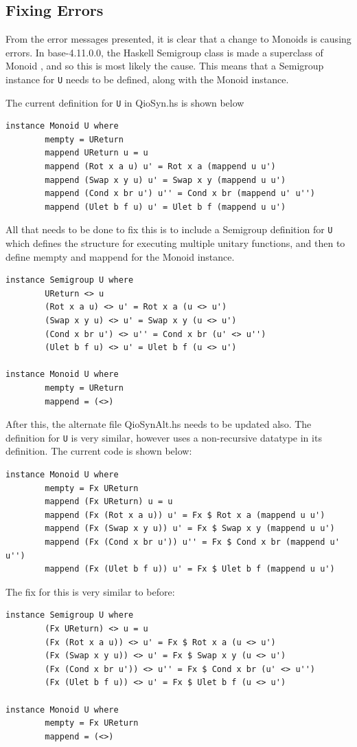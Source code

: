 \documentclass[a4paper,11pt, titlepage, twoside]{article}
\begin{document}
\subsection{Fixing Errors}
From the error messages presented, it is clear that a change to Monoids is causing errors. In base-4.11.0.0, the Haskell Semigroup class is made a superclass of Monoid \cite{base411}, and so this is most likely the cause. This means that a Semigroup instance for \texttt{U} needs to be defined, along with the Monoid instance.\par
The current definition for \texttt{U} in QioSyn.hs is shown below
\begin{verbatim}
instance Monoid U where
        mempty = UReturn
        mappend UReturn u = u
        mappend (Rot x a u) u' = Rot x a (mappend u u')
        mappend (Swap x y u) u' = Swap x y (mappend u u')
        mappend (Cond x br u') u'' = Cond x br (mappend u' u'')
        mappend (Ulet b f u) u' = Ulet b f (mappend u u') 
\end{verbatim}
All that needs to be done to fix this is to include a Semigroup definition for \texttt{U} which defines the structure for executing multiple unitary functions, and then to define mempty and mappend for the Monoid instance.
\begin{verbatim}
instance Semigroup U where
        UReturn <> u
        (Rot x a u) <> u' = Rot x a (u <> u')
        (Swap x y u) <> u' = Swap x y (u <> u')
        (Cond x br u') <> u'' = Cond x br (u' <> u'')
        (Ulet b f u) <> u' = Ulet b f (u <> u')
        
instance Monoid U where
        mempty = UReturn
        mappend = (<>)
\end{verbatim}\par
After this, the alternate file QioSynAlt.hs needs to be updated also. The definition for \texttt{U} is very similar, however uses a non-recursive datatype in its definition. The current code is shown below:
\begin{verbatim}
instance Monoid U where
        mempty = Fx UReturn
        mappend (Fx UReturn) u = u
        mappend (Fx (Rot x a u)) u' = Fx $ Rot x a (mappend u u')
        mappend (Fx (Swap x y u)) u' = Fx $ Swap x y (mappend u u')
        mappend (Fx (Cond x br u')) u'' = Fx $ Cond x br (mappend u' u'')
        mappend (Fx (Ulet b f u)) u' = Fx $ Ulet b f (mappend u u') 
\end{verbatim}
The fix for this is very similar to before:
\begin{verbatim}
instance Semigroup U where
        (Fx UReturn) <> u = u
        (Fx (Rot x a u)) <> u' = Fx $ Rot x a (u <> u')
        (Fx (Swap x y u)) <> u' = Fx $ Swap x y (u <> u')
        (Fx (Cond x br u')) <> u'' = Fx $ Cond x br (u' <> u'')
        (Fx (Ulet b f u)) <> u' = Fx $ Ulet b f (u <> u') 
        
instance Monoid U where
        mempty = Fx UReturn
        mappend = (<>)
\end{verbatim}\par
\end{document}
